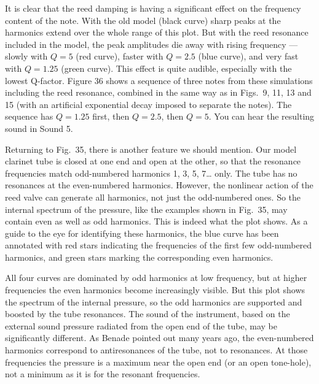   It is clear that the reed damping is having a significant effect on the 
  frequency content of the note. With the old model (black curve) sharp peaks 
  at the harmonics extend over the whole range of this plot. But with the reed 
  resonance included in the model, the peak amplitudes die away with rising 
  frequency — slowly with $Q=5$ (red curve), faster with $Q=2.5$ (blue curve), 
  and very fast with $Q=1.25$ (green curve). This effect is quite audible, 
  especially with the lowest Q-factor. Figure 36 shows a sequence of three 
  notes from these simulations including the reed resonance, combined in the 
  same way as in Figs.\ 9, 11, 13 and 15 (with an artificial exponential decay 
  imposed to separate the notes). The sequence has $Q=1.25$ first, then 
  $Q=2.5$, then $Q=5$. You can hear the resulting sound in Sound 5. 



  Returning to Fig.\ 35, there is another feature we should mention. Our model 
  clarinet tube is closed at one end and open at the other, so that the 
  resonance frequencies match odd-numbered harmonics 1, 3, 5, 7… only. The tube 
  has no resonances at the even-numbered harmonics. However, the nonlinear 
  action of the reed valve can generate all harmonics, not just the 
  odd-numbered ones. So the internal spectrum of the pressure, like the 
  examples shown in Fig.\ 35, may contain even as well as odd harmonics. This 
  is indeed what the plot shows. As a guide to the eye for identifying these 
  harmonics, the blue curve has been annotated with red stars indicating the 
  frequencies of the first few odd-numbered harmonics, and green stars marking 
  the corresponding even harmonics. 

  All four curves are dominated by odd harmonics at low frequency, but at 
  higher frequencies the even harmonics become increasingly visible. But this 
  plot shows the spectrum of the internal pressure, so the odd harmonics are 
  supported and boosted by the tube resonances. The sound of the instrument, 
  based on the external sound pressure radiated from the open end of the tube, 
  may be significantly different. As Benade pointed out many years ago, the 
  even-numbered harmonics correspond to antiresonances of the tube, not to 
  resonances. At those frequencies the pressure is a maximum near the open end 
  (or an open tone-hole), not a minimum as it is for the resonant frequencies. 


